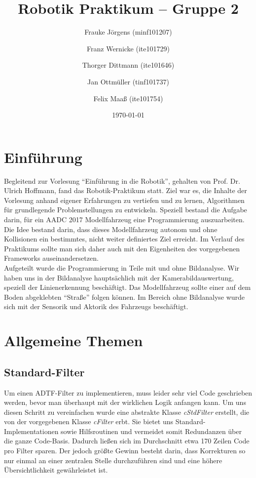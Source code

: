 \documentclass[a4paper,12pt]{report}
\begin{document}

	\title{Robotik Praktikum -- Gruppe 2}
	\author{Frauke Jörgens (minf101207) \and Franz Wernicke (ite101729) \and Thorger Dittmann (ite101646) \and Jan Ottmüller (tinf101737) \and Felix Maaß (ite101754)}
	\date{\today}
	\maketitle

	\tableofcontents



\chapter{Einführung}

Begleitend zur Vorlesung ``Einführung in die Robotik'', gehalten von Prof. Dr. Ulrich Hoffmann, fand das Robotik-Praktikum statt. Ziel war es, die Inhalte der Vorlesung anhand eigener Erfahrungen zu vertiefen und zu lernen, Algorithmen für grundlegende Problemstellungen zu entwickeln. Speziell bestand die Aufgabe darin, für ein AADC 2017 Modellfahrzeug eine Programmierung auszuarbeiten. Die Idee bestand darin, dass dieses Modellfahrzeug autonom und ohne Kollisionen ein bestimmtes, nicht weiter definiertes Ziel erreicht. Im Verlauf des Praktikums sollte man sich daher auch mit den Eigenheiten des vorgegebenen Frameworks auseinandersetzen.\\
Aufgeteilt wurde die Programmierung in Teile mit und ohne Bildanalyse. Wir haben uns in der Bildanalyse hauptsächlich mit der Kamerabildauswertung, speziell der Linienerkennung beschäftigt. Das Modellfahrzeug sollte einer auf dem Boden abgeklebten ``Straße'' folgen können. Im Bereich ohne Bildanalyse wurde sich mit der Sensorik und Aktorik des Fahrzeugs beschäftigt.\\

\chapter{Allgemeine Themen}
\section{Standard-Filter}

	Um einen ADTF-Filter zu implementieren, muss leider sehr viel Code geschrieben werden, bevor man überhaupt mit der wirklichen Logik anfangen kann.
	Um uns diesen Schritt zu vereinfachen wurde eine abstrakte Klasse \emph{cStdFilter} erstellt, die von der vorgegebenen Klasse \emph{cFilter} erbt.
	Sie bietet uns Standard-Implementationen sowie Hilfsroutinen und vermeidet somit Redundanzen über die ganze Code-Basis.
	Dadurch ließen sich im Durchschnitt etwa 170 Zeilen Code pro Filter sparen.
	Der jedoch größte Gewinn besteht darin, dass Korrekturen so nur einmal an einer zentralen Stelle durchzuführen sind und eine höhere Übersichtlichkeit gewährleistet ist.
	
\end{document}
